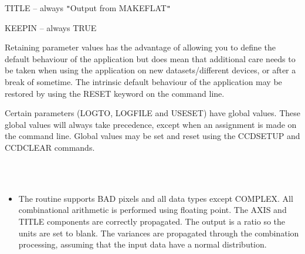 \documentclass[twoside,11pt]{article}
\newcommand{\htmlref}[2]{#1}
\renewcommand{\_}{\texttt{\symbol{95}}}
\newcommand{\qt}[1]{{\tt "}#1{\tt "}}
\newcommand{\xroutine}[1]{\htmlref{{\sc #1}}{#1}}
\newcommand{\sstimplementationstatus}[1]{
   \item[{Implementation Status:}] \mbox{} \\[1.3ex] #1}
\newcommand{\sstitemlist}[1]{
  \mbox{} \\
  \vspace{-3.5ex}
  \begin{itemize}
     #1
  \end{itemize}
}
\newcommand{\sstitem}{\item}
\newcommand{\sstimplementationstatus}[1]{
      \item[Implementation Status:] #1
   }
\newcommand{\sstitemlist}[1]{
      \begin{itemize}
         #1
      \end{itemize}
      \\
   }
\newcommand{\sstitem}{\item}
\begin{document}
{{{         \sstitem
            TITLE   -- always \qt{Output from MAKEFLAT}

         \sstitem
            KEEPIN  -- always TRUE

      }
      Retaining parameter values has the advantage of allowing you to
      define the default behaviour of the application but does mean
      that additional care needs to be taken when using the application
      on new datasets/different devices, or after a break of sometime.
      The intrinsic default behaviour of the application may be
      restored by using the RESET keyword on the command line.

      Certain parameters (LOGTO, LOGFILE and USESET) have global values. These
      global values will always take precedence, except when an
      assignment is made on the command line.  Global values may be set
      and reset using the \xroutine{CCDSETUP} and \xroutine{CCDCLEAR} commands.
   }
   \sstimplementationstatus{
      \sstitemlist{

         \sstitem
         The routine supports BAD pixels and all data types except
           COMPLEX.  All combinational arithmetic is performed using
           floating point.  The AXIS and TITLE components are
           correctly propagated. The output is a ratio so the units are set
           to blank. The variances are propagated through the combination
           processing, assuming that the input data have a normal
           distribution.
      }
   }
}
\end{document}
